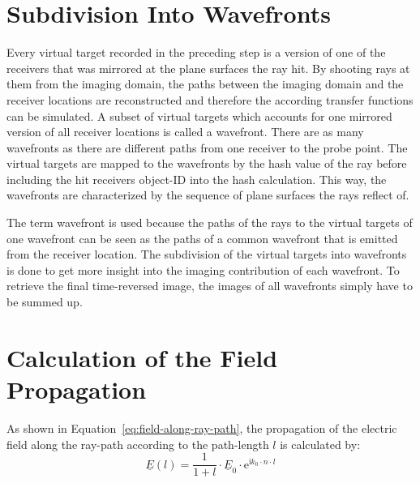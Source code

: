 \section{Subdivision Into Wavefronts}\label{section:subdivision_into_wavefronts}
Every virtual target recorded in the preceding step is a version of one of the receivers that was mirrored at the plane surfaces the ray hit.
By shooting rays at them from the imaging domain, the paths between the imaging domain and the receiver locations are reconstructed and therefore the according transfer functions can be simulated.
A subset of virtual targets which accounts for one mirrored version of all receiver locations is called a wavefront.
There are as many wavefronts as there are different paths from one receiver to the probe point.
The virtual targets are mapped to the wavefronts by the hash value of the ray before including the hit receivers object-ID into the hash calculation.
This way, the wavefronts are characterized by the sequence of plane surfaces the rays reflect of.

The term wavefront is used because the paths of the rays to the virtual targets of one wavefront can be seen as the paths of a common wavefront that is emitted from the receiver location.
The subdivision of the virtual targets into wavefronts is done to get more insight into the imaging contribution of each wavefront.
To retrieve the final time-reversed image, the images of all wavefronts simply have to be summed up.


\section{Calculation of the Field Propagation}\label{section:calculation_of_the_field_propagation}
As shown in Equation~\eqref{eq:field-along-ray-path}, the propagation of the electric field along the ray-path according to the path-length \(l\) is calculated by:
\begin{equation}
    \underline{E}(l) = \frac{1}{1 + l} \cdot \underline{E}_0 \cdot \mathrm{e}^{\mathrm{i} k_0 \cdot n \cdot l}
\end{equation} 

